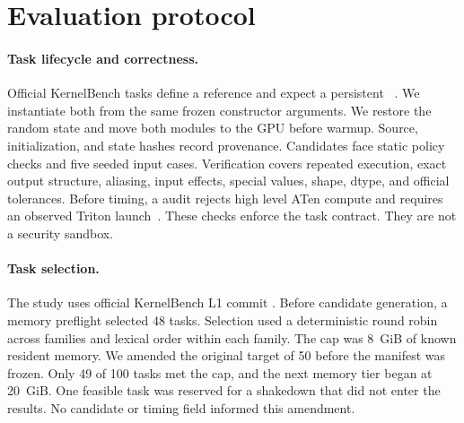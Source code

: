 \section{Evaluation protocol}

\paragraph{Task lifecycle and correctness.}
Official KernelBench tasks define a reference  and expect a
persistent ~\citep{kernelbench2025}. We instantiate both from the
same frozen constructor arguments. We restore the random state and move both
modules to the GPU before warmup. Source, initialization, and state hashes record
provenance. Candidates face static policy checks and five seeded input cases.
Verification covers repeated execution, exact output structure, aliasing, input
effects, special values, shape, dtype, and official tolerances. Before timing, a
 audit rejects high level ATen compute and requires an
observed Triton launch~\citep{tillet2019triton}. These checks enforce the task
contract. They are not a security sandbox.

\paragraph{Task selection.}
The study uses official KernelBench L1 commit . Before candidate
generation, a memory preflight selected 48 tasks. Selection used a deterministic
round robin across families and lexical order within each family. The cap was
8~GiB of known resident memory. We amended the original target of 50 before the
manifest was frozen. Only 49 of 100 tasks met the cap, and the next memory tier
began at 20~GiB. One feasible task was reserved for a shakedown that did not
enter the results. No candidate or timing field informed this amendment.

